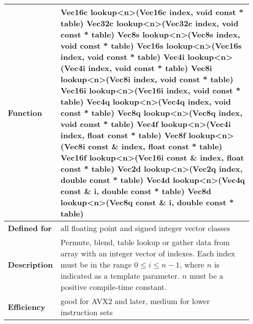 \documentclass[vcl_manual.tex]{subfiles}
\begin{document}
\begin{tabular}{|p{30mm}|p{120mm}|}
\hline
\bfseries Function & Vec16c lookup\textless n\textgreater(Vec16c index, void const * table) \newline
Vec32c lookup\textless n\textgreater(Vec32c index, void const * table) \newline
Vec8s lookup\textless n\textgreater(Vec8s index, void const * table) \newline
Vec16s lookup\textless n\textgreater(Vec16s index, void const * table) \newline
Vec4i lookup\textless n\textgreater(Vec4i index, void const * table) \newline
Vec8i lookup\textless n\textgreater(Vec8i index, void const * table) \newline
Vec16i lookup\textless n\textgreater(Vec16i index, void const * table) \newline
Vec4q lookup\textless n\textgreater(Vec4q index, void const * table) \newline
Vec8q lookup\textless n\textgreater(Vec8q index, void const * table) \newline
Vec4f lookup\textless n\textgreater(Vec4i index, float const * table) \newline
Vec8f lookup\textless n\textgreater(Vec8i const \& index, float const * table) \newline
Vec16f lookup\textless n\textgreater(Vec16i const \& index, float const * table) \newline
Vec2d lookup\textless n\textgreater(Vec2q index, double const * table) \newline
Vec4d lookup\textless n\textgreater(Vec4q const \& i, double const * table) \newline
Vec8d lookup\textless n\textgreater(Vec8q const \& i, double const * table) \\ \hline
\bfseries Defined for & all floating point and signed integer vector classes \\ \hline
\bfseries Description & Permute, blend, table lookup or gather data from array with an integer vector of indexes.\newline
Each index must be in the range  $0 \leq i \leq n-1$, where $n$ is indicated as a template parameter. $n$ must be a positive compile-time constant. \\ \hline
\bfseries Efficiency & good for AVX2 and later, medium for lower instruction sets \\ \hline
\end{tabular}
\end{document}
